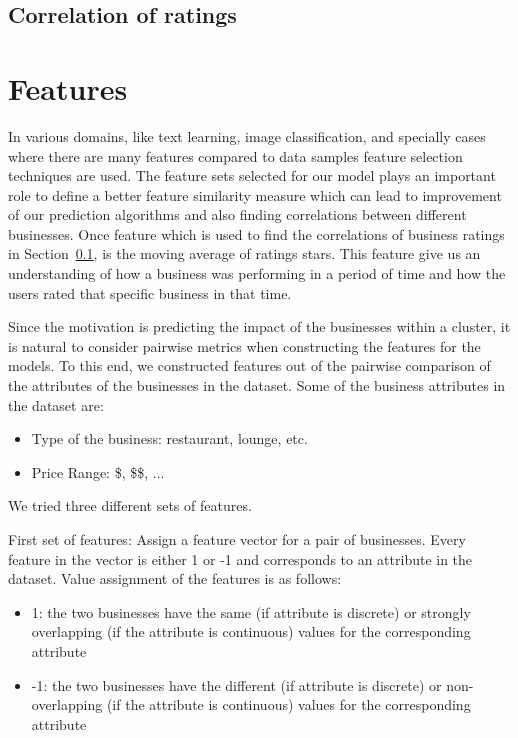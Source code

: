 \documentclass{vldb}
\begin{document}
\subsection{Correlation of ratings}
\label{sec:correlation_of_ratings}



\section{Features}
In various domains, like text learning, image classification, and specially cases where there are many features compared to data samples feature selection techniques are used. The feature sets selected for our model plays an important role to define a better feature similarity measure which can lead to improvement of our prediction algorithms and also finding correlations between different businesses.
Once feature which is used to find the correlations of business ratings in Section~\ref{sec:correlation_of_ratings}, is the moving average of ratings stars. This feature give us an understanding of how a business was performing in a period of time and how the users rated that specific business in that time.

Since the motivation is predicting the impact of the businesses within a cluster, it is natural to consider pairwise metrics when constructing the features for the models. To this end, we constructed features out of the pairwise comparison of the attributes of the businesses in the dataset. Some of the business attributes in the dataset are:
\begin{itemize}
  \item Type of the business: restaurant, lounge, etc.
  \item Price Range: \$, \$\$, ...
\end{itemize}

We tried three different sets of features.

First set of features: Assign a feature vector for a pair of businesses. Every feature in the vector is either 1 or -1 and corresponds to an attribute in the dataset. Value assignment of the features is as follows:
\begin{itemize}
\item 1: the two businesses have the same (if attribute is discrete) or strongly overlapping (if the attribute is continuous) values for the corresponding attribute
\item -1: the two businesses have the different (if attribute is discrete) or non-overlapping (if the attribute is continuous) values for the corresponding attribute
\end{itemize}
\end{document}
